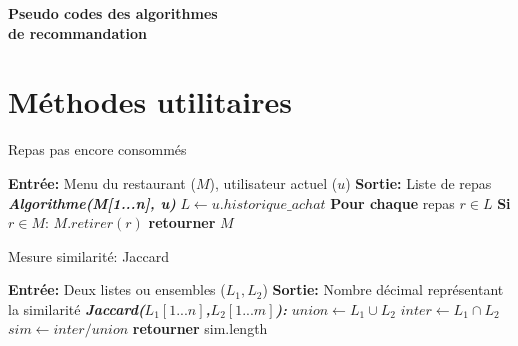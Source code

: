 \documentclass[11pt]{article}
\begin{document}
\begin{center}
    \Large \textbf{Pseudo codes des algorithmes\\ de recommandation}
\end{center}

\section{Méthodes utilitaires}
\begin{algorithm}
    \caption{Repas pas encore consommés}
    \begin{algorithmic}[1]
    \Statex \textbf{Entrée:} Menu du restaurant ($M$), utilisateur actuel ($u$)
    \Statex \textbf{Sortie:} Liste de repas
    \State \textbf{\textit{Algorithme(M[1...n], u)}}
    \State \hspace{0.5cm} $L \leftarrow u.historique\_achat$
    \State \hspace{0.5cm} \textbf{Pour chaque} repas $r \in L$
    \State \hspace{1cm} \textbf{Si} $r \in M$:
    \State \hspace{1.5cm} $M.retirer(r)$
    \State \hspace{0.5cm} \textbf{retourner} $M$
    \end{algorithmic}
\end{algorithm}

\begin{algorithm}
    \caption{Mesure similarité: Jaccard}
    \begin{algorithmic}[1]
    \Statex \textbf{Entrée:} Deux listes ou ensembles ($L_1, L_2$)
    \Statex \textbf{Sortie:} Nombre décimal représentant la similarité
    \State \textbf{\textit{Jaccard($L_1[1...n]$,$L_2[1...m]$):}}
    \State \hspace{0.5cm} $union \leftarrow L_1 \cup L_2$
    \State \hspace{0.5cm} $inter \leftarrow L_1 \cap L_2$
    \State \hspace{0.5cm} $sim \leftarrow inter/union$
    \State \hspace{0.5cm} \textbf{retourner} sim.length
    \end{algorithmic}
\end{algorithm}
\end{document}
